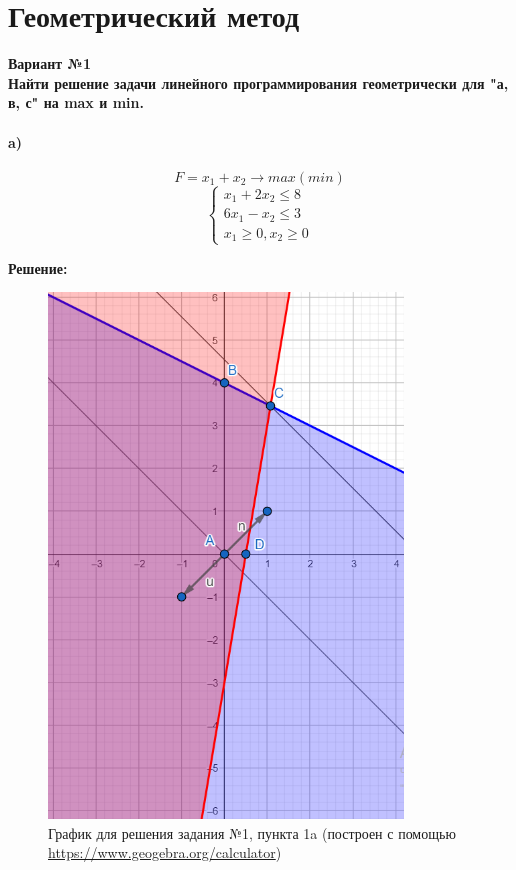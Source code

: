 \chapter{Геометрический метод}
{\bf Вариант №1\\Найти решение задачи линейного программирования геометрически для "а, в, с" на max и min.}

\subsubsection{a)}
\begin{equation*}
    F = x_1 + x_2 \rightarrow max(min)
\end{equation*}
\begin{equation*}
    \begin{cases}
        x_1 + 2x_2 \le 8 \\
        6x_1 - x_2 \le 3 \\
        x_1 \ge 0, x_2 \ge 0
    \end{cases}
\end{equation*}

\begin{center}
    {\bf
    Решение:}
\end{center}

\begin{figure}[ht]
\centering
\includegraphics[]{пункт а.png}
\centering
\caption{График для решения задания №1, пункта 1a (построен с помощью \url{https://www.geogebra.org/calculator})}
\end{figure}

